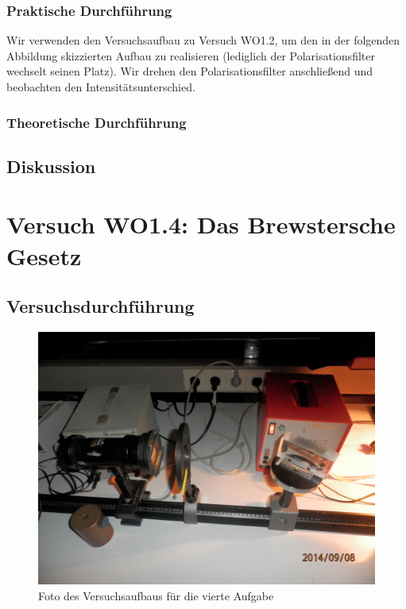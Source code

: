 \documentclass[12pt]{scrartcl}
\begin{document}
\subsubsection{Praktische Durchführung}
Wir verwenden den Versuchsaufbau zu Versuch WO1.2, um den in der folgenden Abbildung skizzierten Aufbau zu realisieren (lediglich der Polarisationsfilter wechselt seinen Platz).
Wir drehen den Polarisationsfilter anschließend und beobachten den Intensitätsunterschied.
\subsubsection{Theoretische Durchführung}
\subsection{Diskussion}

\section{Versuch WO1.4:
Das Brewstersche Gesetz}
\subsection{Versuchsdurchführung}

\begin{figure}[H]
\centering
    \includegraphics[scale = 0.1]{aufgabe_4.JPG}
  	\caption[Foto des Versuchsaufbaus für die vierte Aufgabe]{Foto des Versuchsaufbaus für die vierte Aufgabe}
  \label{fig:aufgabe_4}
\end{figure}
\end{document}
